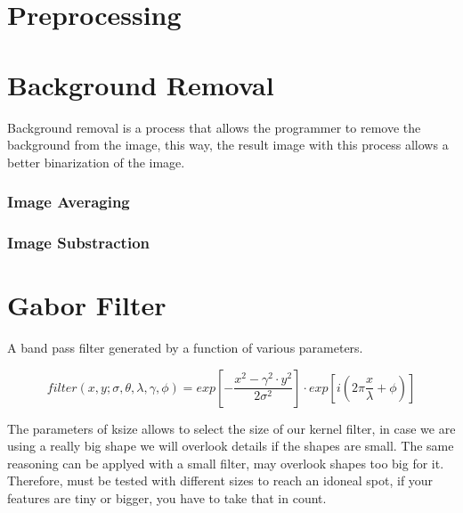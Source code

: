 \documentclass[11pt,twoside,a4paper]{article}
\begin{document}
\section{Preprocessing}


\section{Background Removal} 
Background removal is a process that allows the programmer to remove the background from the image, this way, the result image with this process allows a better binarization of the image.




\subsubsection{Image Averaging}



\subsubsection{Image Substraction}



\section{Gabor Filter}



A band pass filter generated by a function of various parameters.

\begin{equation}
    filter(x,y;\sigma,\theta,\lambda,\gamma,\phi) = exp [ - \frac{x^2 - \gamma ^2 \cdot y^2}{2 \sigma^2} ] \cdot exp [ i (2 \pi \frac{x}{\lambda} + \phi) ] 
\end{equation}


The parameters of ksize allows to select the size of our kernel filter, in case we are using a really big shape we will overlook details if the shapes are small. The same reasoning can be applyed with a small filter, may overlook shapes too big for it. Therefore, must be tested with different sizes to reach an idoneal spot, if your features are tiny or bigger, you have to take that in count.
\end{document}

